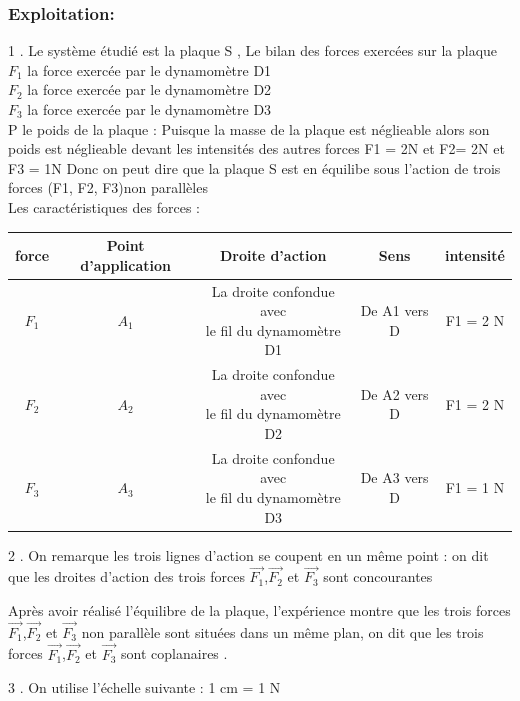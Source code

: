 \documentclass[12pt]{article}
\begin{document}
\subsubsection{ Exploitation: }
 1 . Le système étudié est la plaque {S} , Le bilan des forces exercées sur la plaque
 \\$F_1$ la force exercée par le dynamomètre D1
 \\ $F_2$ la force exercée par le dynamomètre D2
 \\ $F_3$ la force exercée par le dynamomètre D3
 \\P  le poids de la plaque : Puisque la masse de la plaque est néglieable alors son poids est néglieable devant
les intensités des autres forces F1 = 2N et F2= 2N et F3 = 1N
Donc on peut dire que la plaque S est en équilibe sous l’action de trois forces (F1, F2, F3)non parallèles
\\Les caractéristiques des forces : 
\begin{center}
  \begin{tabular}{|c|c|c|c|c|}
    \hline
    force & Point d’application & Droite d’action & Sens &intensité \\\hline
    $F_1$ & $A_1$               & \makecell{La droite confondue avec \\ le fil du dynamomètre D1}  & De A1 vers D  & F1 = 2 N  \\\hline
    $F_2$ & $A_2$               & \makecell{ La droite confondue avec \\ le fil du dynamomètre D2 } & De A2 vers D  & F1 = 2 N  \\\hline
    $F_3$ & $A_3$               & \makecell{La droite confondue avec\\ le fil du dynamomètre D3}& De A3 vers D  & F1 = 1 N  \\\hline

  \end{tabular}
\end{center}

2 . On remarque les trois lignes d’action se coupent en un même point : on dit que les droites d’action des
trois forces $\vec{F_1}$,$\vec{F_2}$ et $\vec{F_3}$ sont concourantes

Après avoir réalisé l’équilibre de la plaque, l’expérience montre que les trois forces $\vec{F_1}$,$\vec{F_2}$ et $\vec{F_3}$ non parallèle sont situées dans un même plan, on dit que les trois forces $\vec{F_1}$,$\vec{F_2}$ et $\vec{F_3}$ sont coplanaires .

3 . On utilise l’échelle suivante : 1 cm = 1 N
\end{document}
